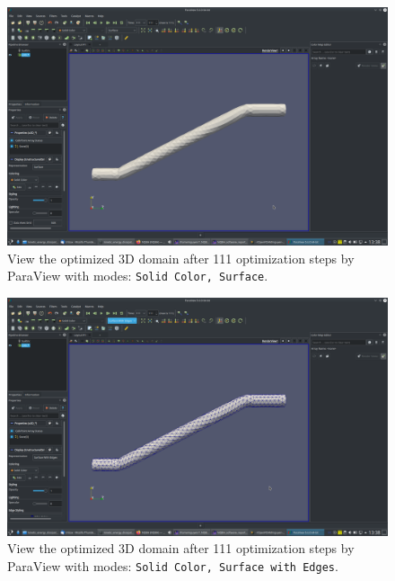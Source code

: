 \documentclass[onsided]{book}
\numberwithin{equation}{section}
\begin{document}
\begin{enumerate}
\begin{enumerate}
        \begin{figure}[H]
            \centering
            \includegraphics[height=0.44\textheight]{optimized_domain_3D_after_111_steps_Solid_Color_Surface}
            \caption{View the optimized 3D domain after 111 optimization steps by ParaView with modes: \texttt{Solid Color, Surface}.}
        \end{figure}
        
        \begin{figure}[H]
            \centering
            \includegraphics[height=0.44\textheight]{optimized_domain_3D_after_111_steps_Solid_Color_Surface_with_Edges}
            \caption{View the optimized 3D domain after 111 optimization steps by ParaView with modes: \texttt{Solid Color, Surface with Edges}.}
        \end{figure}
        

\end{enumerate}
\end{enumerate}
\end{document}
